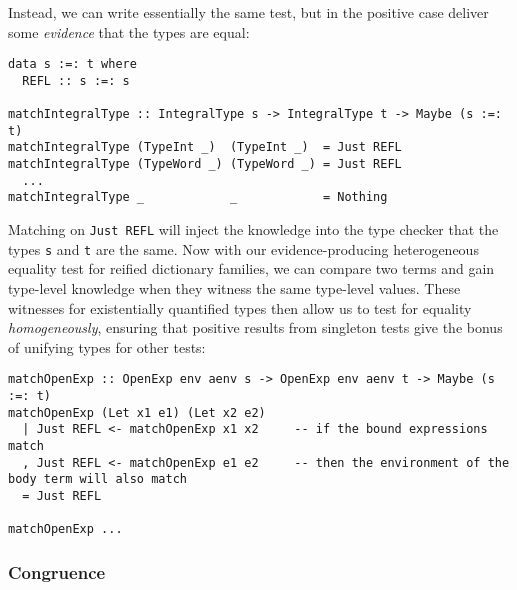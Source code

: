 Instead, we can write essentially the same test, but in the positive case
deliver some \emph{evidence} that the types are equal:
%
\begin{lstlisting}[style=haskell]
data s :=: t where
  REFL :: s :=: s

matchIntegralType :: IntegralType s -> IntegralType t -> Maybe (s :=: t)
matchIntegralType (TypeInt _)  (TypeInt _)  = Just REFL
matchIntegralType (TypeWord _) (TypeWord _) = Just REFL
  ...
matchIntegralType _            _            = Nothing
\end{lstlisting}
%
Matching on \lstinline{Just REFL} will inject the knowledge into the type
checker that the types \texttt{s} and \texttt{t} are the same. Now with our
evidence-producing heterogeneous equality test for reified dictionary families,
we can compare two terms and gain type-level knowledge when they witness the
same type-level values. These witnesses for existentially quantified types then
allow us to test for equality \emph{homogeneously}, ensuring that positive
results from singleton tests give the bonus of unifying types for other tests:
%
\begin{lstlisting}[style=haskell]
matchOpenExp :: OpenExp env aenv s -> OpenExp env aenv t -> Maybe (s :=: t)
matchOpenExp (Let x1 e1) (Let x2 e2)
  | Just REFL <- matchOpenExp x1 x2     -- if the bound expressions match
  , Just REFL <- matchOpenExp e1 e2     -- then the environment of the body term will also match
  = Just REFL

matchOpenExp ...
\end{lstlisting}

\subsubsection{Congruence}

